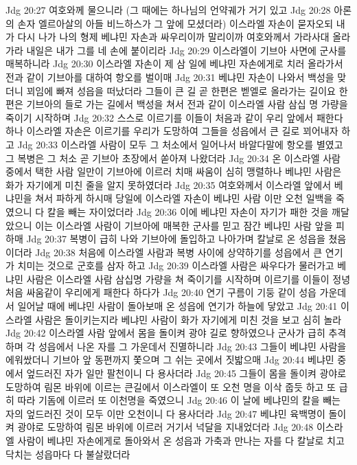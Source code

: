 Jdg 20:27  여호와께 물으니라 (그 때에는 하나님의 언약궤가 거기 있고
Jdg 20:28  아론의 손자 엘르아살의 아들 비느하스가 그 앞에 모셨더라) 이스라엘 자손이 묻자오되 내가 다시 나가 나의 형제 베냐민 자손과 싸우리이까 말리이까 여호와께서 가라사대 올라가라 내일은 내가 그를 네 손에 붙이리라
Jdg 20:29  이스라엘이 기브아 사면에 군사를 매복하니라
Jdg 20:30  이스라엘 자손이 제 삼 일에 베냐민 자손에게로 치러 올라가서 전과 같이 기브아를 대하여 항오를 벌이매
Jdg 20:31  베냐민 자손이 나와서 백성을 맞더니 꾀임에 빠져 성읍을 떠났더라 그들이 큰 길 곧 한편은 벧엘로 올라가는 길이요 한편은 기브아의 들로 가는 길에서 백성을 쳐서 전과 같이 이스라엘 사람 삼십 명 가량을 죽이기 시작하며
Jdg 20:32  스스로 이르기를 이들이 처음과 같이 우리 앞에서 패한다 하나 이스라엘 자손은 이르기를 우리가 도망하여 그들을 성읍에서 큰 길로 꾀어내자 하고
Jdg 20:33  이스라엘 사람이 모두 그 처소에서 일어나서 바알다말에 항오를 별였고 그 복병은 그 처소 곧 기브아 초장에서 쏟아져 나왔더라
Jdg 20:34  온 이스라엘 사람 중에서 택한 사람 일만이 기브아에 이르러 치매 싸움이 심히 맹렬하나 베냐민 사람은 화가 자기에게 미친 줄을 알지 못하였더라
Jdg 20:35  여호와께서 이스라엘 앞에서 베냐민을 쳐서 파하게 하시매 당일에 이스라엘 자손이 베냐민 사람 이만 오천 일백을 죽였으니 다 칼을 빼는 자이었더라
Jdg 20:36  이에 베냐민 자손이 자기가 패한 것을 깨달았으니 이는 이스라엘 사람이 기브아에 매복한 군사를 믿고 잠간 베냐민 사람 앞을 피하매
Jdg 20:37  복병이 급히 나와 기브아에 돌입하고 나아가며 칼날로 온 성읍을 쳤음이더라
Jdg 20:38  처음에 이스라엘 사람과 복병 사이에 상약하기를 성읍에서 큰 연기가 치미는 것으로 군호를 삼자 하고
Jdg 20:39  이스라엘 사람은 싸우다가 물러가고 베냐민 사람은 이스라엘 사람 삼십명 가량을 쳐 죽이기를 시작하며 이르기를 이들이 정녕 처음 싸움같이 우리에게 패한다 하다가
Jdg 20:40  연기 구름이 기둥 같이 성읍 가운데서 일어날 때에 베냐민 사람이 돌아보매 온 성읍에 연기가 하늘에 닿았고
Jdg 20:41  이스라엘 사람은 돌이키는지라 베냐민 사람이 화가 자기에게 미친 것을 보고 심히 놀라
Jdg 20:42  이스라엘 사람 앞에서 몸을 돌이켜 광야 길로 향하였으나 군사가 급히 추격하며 각 성읍에서 나온 자를 그 가운데서 진멸하니라
Jdg 20:43  그들이 베냐민 사람을 에워쌌더니 기브아 앞 동편까지 쫓으며 그 쉬는 곳에서 짓밟으매
Jdg 20:44  베냐민 중에서 엎드러진 자가 일만 팔천이니 다 용사더라
Jdg 20:45  그들이 몸을 돌이켜 광야로 도망하여 림몬 바위에 이르는 큰길에서 이스라엘이 또 오천 명을 이삭 줍듯 하고 또 급히 따라 기돔에 이르러 또 이천명을 죽였으니
Jdg 20:46  이 날에 베냐민의 칼을 빼는 자의 엎드러진 것이 모두 이만 오천이니 다 용사더라
Jdg 20:47  베냐민 육백명이 돌이켜 광야로 도망하여 림몬 바위에 이르러 거기서 넉달을 지내었더라
Jdg 20:48  이스라엘 사람이 베냐민 자손에게로 돌아와서 온 성읍과 가축과 만나는 자를 다 칼날로 치고 닥치는 성읍마다 다 불살랐더라
